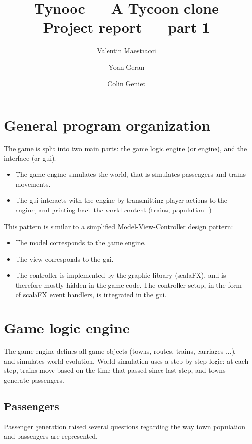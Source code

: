 \documentclass{article}
\begin{document}
\title{Tynooc --- A Tycoon clone \\ \large{Project report --- part 1}}
\author{Valentin Maestracci \and Yoan Geran \and Colin Geniet}
\maketitle

\tableofcontents

\section{General program organization}
The game is split into two main parts: the game logic engine (or engine), and the interface (or gui).
\begin{itemize}
\item The game engine simulates the world, that is simulates passengers and trains movements.
\item The gui interacts with the engine by transmitting player actions to the engine, 
and printing back the world content (trains, population\dots).
\end{itemize}

This pattern is similar to a simplified Model-View-Controller design pattern:
\begin{itemize}[noitemsep]
\item The model corresponds to the game engine.
\item The view corresponds to the gui.
\item The controller is implemented by the graphic library (scalaFX), and is therefore mostly hidden in the game code.
The controller setup, in the form of scalaFX event handlers, is integrated in the gui.
\end{itemize}



\section{Game logic engine}
The game engine defines all game objects (towns, routes, trains, carriages ...), and simulates world evolution.
World simulation uses a step by step logic: at each step, trains move based on the time that passed since last step,
and towns generate passengers.

\subsection{Passengers}
Passenger generation raised several questions regarding the way town population and passengers are represented.
\end{document}
